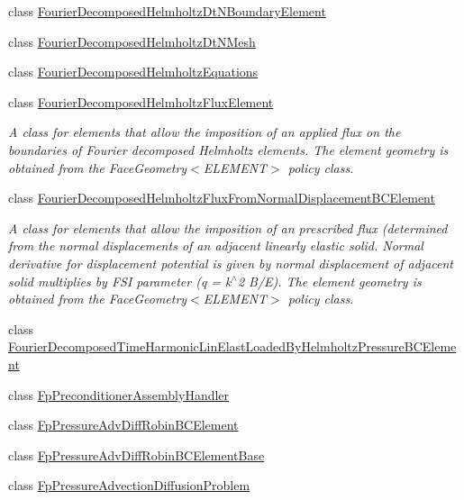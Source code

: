 \begin{DoxyCompactItemize}
class \hyperlink{classoomph_1_1FourierDecomposedHelmholtzDtNBoundaryElement}{Fourier\+Decomposed\+Helmholtz\+Dt\+N\+Boundary\+Element}
\item 
class \hyperlink{classoomph_1_1FourierDecomposedHelmholtzDtNMesh}{Fourier\+Decomposed\+Helmholtz\+Dt\+N\+Mesh}
\item 
class \hyperlink{classoomph_1_1FourierDecomposedHelmholtzEquations}{Fourier\+Decomposed\+Helmholtz\+Equations}
\item 
class \hyperlink{classoomph_1_1FourierDecomposedHelmholtzFluxElement}{Fourier\+Decomposed\+Helmholtz\+Flux\+Element}
\begin{DoxyCompactList}\small\item\em A class for elements that allow the imposition of an applied flux on the boundaries of Fourier decomposed Helmholtz elements. The element geometry is obtained from the Face\+Geometry$<$\+E\+L\+E\+M\+E\+N\+T$>$ policy class. \end{DoxyCompactList}\item 
class \hyperlink{classoomph_1_1FourierDecomposedHelmholtzFluxFromNormalDisplacementBCElement}{Fourier\+Decomposed\+Helmholtz\+Flux\+From\+Normal\+Displacement\+B\+C\+Element}
\begin{DoxyCompactList}\small\item\em A class for elements that allow the imposition of an prescribed flux (determined from the normal displacements of an adjacent linearly elastic solid. Normal derivative for displacement potential is given by normal displacement of adjacent solid multiplies by F\+SI parameter (q = k$^\wedge$2 B/E). The element geometry is obtained from the Face\+Geometry$<$\+E\+L\+E\+M\+E\+N\+T$>$ policy class. \end{DoxyCompactList}\item 
class \hyperlink{classoomph_1_1FourierDecomposedTimeHarmonicLinElastLoadedByHelmholtzPressureBCElement}{Fourier\+Decomposed\+Time\+Harmonic\+Lin\+Elast\+Loaded\+By\+Helmholtz\+Pressure\+B\+C\+Element}
\item 
class \hyperlink{classoomph_1_1FpPreconditionerAssemblyHandler}{Fp\+Preconditioner\+Assembly\+Handler}
\item 
class \hyperlink{classoomph_1_1FpPressureAdvDiffRobinBCElement}{Fp\+Pressure\+Adv\+Diff\+Robin\+B\+C\+Element}
\item 
class \hyperlink{classoomph_1_1FpPressureAdvDiffRobinBCElementBase}{Fp\+Pressure\+Adv\+Diff\+Robin\+B\+C\+Element\+Base}
\item 
class \hyperlink{classoomph_1_1FpPressureAdvectionDiffusionProblem}{Fp\+Pressure\+Advection\+Diffusion\+Problem}

\end{DoxyCompactItemize}
